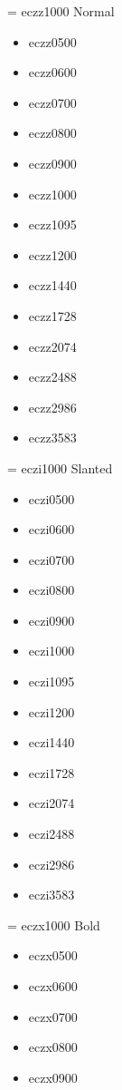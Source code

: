 \documentclass{amsart}
\begin{document}
\bigskip
\noindent{}\textwidth
\parbox[t]{0.235\textwidth}{
\font\temp = eczz1000 \temp
Normal
\begin{itemize}[leftmargin=*]
\item \textsf{eczz0500}
\item \textsf{eczz0600}
\item \textsf{eczz0700}
\item \textsf{eczz0800}
\item \textsf{eczz0900}
\item \textsf{eczz1000}
\item \textsf{eczz1095}
\item \textsf{eczz1200}
\item \textsf{eczz1440}
\item \textsf{eczz1728}
\item \textsf{eczz2074}
\item \textsf{eczz2488}
\item \textsf{eczz2986}
\item \textsf{eczz3583}
\end{itemize}
}\parbox[t]{0.235\textwidth}{
\font\temp = eczi1000 \temp
Slanted
\begin{itemize}[leftmargin=*]
\item \textsf{eczi0500}
\item \textsf{eczi0600}
\item \textsf{eczi0700}
\item \textsf{eczi0800}
\item \textsf{eczi0900}
\item \textsf{eczi1000}
\item \textsf{eczi1095}
\item \textsf{eczi1200}
\item \textsf{eczi1440}
\item \textsf{eczi1728}
\item \textsf{eczi2074}
\item \textsf{eczi2488}
\item \textsf{eczi2986}
\item \textsf{eczi3583}
\end{itemize}
}\parbox[t]{0.235\textwidth}{
\font\temp = eczx1000 \temp
Bold
\begin{itemize}[leftmargin=*]
\item \textsf{eczx0500}
\item \textsf{eczx0600}
\item \textsf{eczx0700}
\item \textsf{eczx0800}
\item \textsf{eczx0900}

\end{itemize}}
\end{document}
